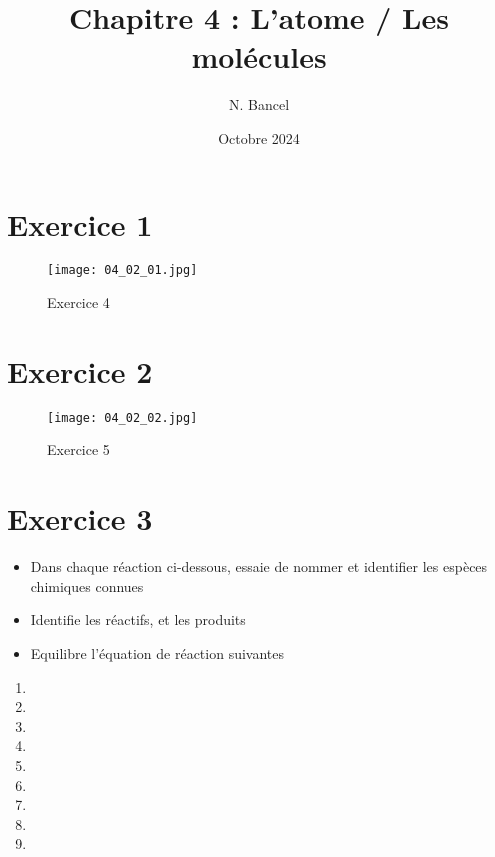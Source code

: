\documentclass[a4paper,12pt]{article}
\begin{document}
\title{Chapitre 4 : L'atome / Les molécules}
\author{N. Bancel}
\date{Octobre 2024}
\maketitle

\section{Exercice 1}

\begin{figure}[H]
  \centering
  \texttt{[image: 04\_02\_01.jpg]}
  \caption{\label{} Exercice 4}
\end{figure}

\section{Exercice 2}

\begin{figure}[H]
  \centering
  \texttt{[image: 04\_02\_02.jpg]}
  \caption{\label{} Exercice 5}
\end{figure}

\section{Exercice 3}

\begin{itemize}[noitemsep]
\item Dans chaque réaction ci-dessous, essaie de nommer et identifier les espèces chimiques connues 
\item Identifie les réactifs, et les produits
\item Equilibre l'équation de réaction suivantes
\end{itemize} 

\begin{enumerate}
  \item {}
  \item {}
  \item {}
  \item {}
  \item {}
  \item {}
  \item {}
  \item {}
  \item {}
\end{enumerate} 
\end{document}
